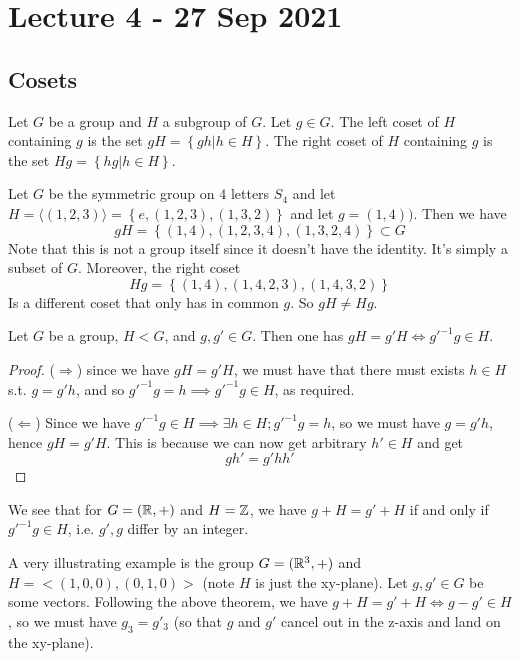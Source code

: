 \section{Lecture 4 - 27 Sep 2021}
\subsection{Cosets}
\begin{definition}
  Let $G$ be a group and $H$ a subgroup of $G$. Let $g\in G$. The left coset of $H$
  containing $g$ is the set $gH=\left\{ gh | h\in H \right\}$. The right coset of $H$
  containing $g$ is the set $Hg=\left\{ hg | h\in H \right\}$.
  \label{coset}
\end{definition}

\begin{ex}
  Let $G$ be the symmetric group on $4$ letters $S_4$ and let $H=\langle(1,2,3)\rangle=\left\{
e,(1,2,3), (1,3,2) \right\}$ and let $g=(1,4))$. Then we have 
\[gH = \left\{ (1,4), (1,2,3,4), (1,3,2,4) \right\} \subset G\]
Note that this is not a group itself since it doesn't have the identity. It's simply a
subset of $G$. Moreover, the right coset
\[Hg = \left\{ (1,4), (1,4,2,3), (1,4,3,2) \right\}\]
Is a different coset that only has in common $g$. So $gH\neq Hg$.
\end{ex}

\begin{theorem}
  Let $G$ be a group, $H<G$, and $g,g'\in G$. Then one has $gH=g'H \iff g'^{-1}g\in H$.
\end{theorem}
\begin{proof}
  ($\Rightarrow$) since we have $gH=g'H$, we must have that there must
  exists $h\in H$ s.t. $g=g'h$, and so $g'^{-1}g=h \implies g'^{-1}g\in H$, as required.

  ($\Leftarrow$) Since we have $g'^{-1}g\in H \implies \exists h\in H ; g'^{-1}g =h$, so
  we must have $g=g' h$, hence $gH=g'H$. This is because we can now get arbitrary $h'\in
  H$ and get \[gh'=g'hh'\] 
\end{proof}

\begin{example}
  We see that for $G=(\mathbb R,+)$ and $H=\mathbb Z$, we have $g+H=g'+H$ if and only if
  $g'^{-1}g\in H$, i.e.  $g',g$ differ by an integer.
\end{example}
\begin{example}
  A very illustrating example is the group $G=(\mathbb R^3, +)$ and $H=<(1,0,0),(0,1,0)>$ (note
  $H$ is just the xy-plane). Let $g,g'\in G$ be some vectors. Following the above theorem,
  we have $g+H=g'+H \iff g-g'\in H$, so we must have $g_3=g'_3$ (so that $g$ and $g'$
    cancel out in the z-axis and land on the xy-plane).
\end{example}

